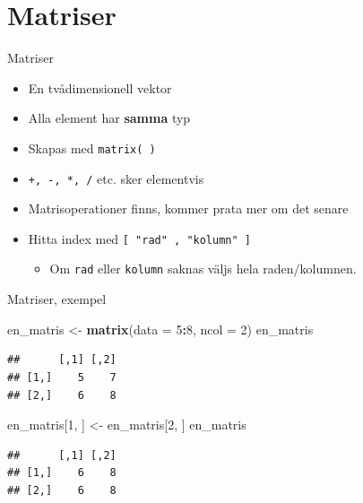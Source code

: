 \documentclass[
  11pt,
  ignorenonframetext,
]{beamer}
\newenvironment{Shaded}{\begin{snugshade}}{\end{snugshade}}
\newcommand{\DataTypeTok}[1]{\textcolor[rgb]{0.13,0.29,0.53}{#1}}
\newcommand{\DecValTok}[1]{\textcolor[rgb]{0.00,0.00,0.81}{#1}}
\newcommand{\KeywordTok}[1]{\textcolor[rgb]{0.13,0.29,0.53}{\textbf{#1}}}
\newcommand{\NormalTok}[1]{#1}
\newcommand{\OperatorTok}[1]{\textcolor[rgb]{0.81,0.36,0.00}{\textbf{#1}}}
\newcommand{\StringTok}[1]{\textcolor[rgb]{0.31,0.60,0.02}{#1}}
\providecommand{\tightlist}{%
  \setlength{\itemsep}{0pt}\setlength{\parskip}{0pt}}
\newcommand\imp[1]{\alert{\textbf{#1}}}
\begin{document}
\hypertarget{matriser}{%
\section{Matriser}\label{matriser}}

\begin{frame}{Matriser}
\protect\hypertarget{matriser-1}{}
\begin{itemize}
\tightlist
\item
  En tvådimensionell vektor
\item
  Alla element har \imp{samma} typ
\item
  Skapas med \texttt{matrix( )}
\item
  \texttt{+, -, *, /} etc. sker elementvis
\item
  Matrisoperationer finns, kommer prata mer om det senare
\item
  Hitta index med \texttt{[ "rad" , "kolumn" ]}

  \begin{itemize}
  \tightlist
  \item
    Om \texttt{rad} eller \texttt{kolumn} saknas väljs hela
    raden/kolumnen.
  \end{itemize}
\end{itemize}
\end{frame}

\begin{frame}[fragile]{Matriser, exempel}
\protect\hypertarget{matriser-exempel}{}
\begin{Shaded}
\begin{Highlighting}[]
\NormalTok{en\_matris \textless{}{-}}\StringTok{ }\KeywordTok{matrix}\NormalTok{(}\DataTypeTok{data =} \DecValTok{5}\OperatorTok{:}\DecValTok{8}\NormalTok{, }\DataTypeTok{ncol =} \DecValTok{2}\NormalTok{)}
\NormalTok{en\_matris}
\end{Highlighting}
\end{Shaded}

\begin{verbatim}
##      [,1] [,2]
## [1,]    5    7
## [2,]    6    8
\end{verbatim}

\pause

\begin{Shaded}
\begin{Highlighting}[]
\NormalTok{en\_matris[}\DecValTok{1}\NormalTok{, ] \textless{}{-}}\StringTok{ }\NormalTok{en\_matris[}\DecValTok{2}\NormalTok{, ]}
\NormalTok{en\_matris}
\end{Highlighting}
\end{Shaded}

\begin{verbatim}
##      [,1] [,2]
## [1,]    6    8
## [2,]    6    8
\end{verbatim}
\end{frame}
\end{document}
